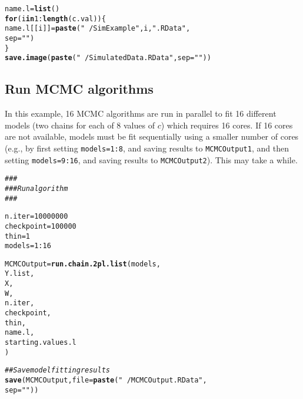 \documentclass[12pt,letterpaper,final]{article}\usepackage[]{graphicx}\usepackage[]{color}
\makeatletter
\newcommand{\hlnum}[1]{\textcolor[rgb]{0.686,0.059,0.569}{#1}}%
\newcommand{\hlstr}[1]{\textcolor[rgb]{0.192,0.494,0.8}{#1}}%
\newcommand{\hlcom}[1]{\textcolor[rgb]{0.678,0.584,0.686}{\textit{#1}}}%
\newcommand{\hlopt}[1]{\textcolor[rgb]{0,0,0}{#1}}%
\newcommand{\hlstd}[1]{\textcolor[rgb]{0.345,0.345,0.345}{#1}}%
\newcommand{\hlkwa}[1]{\textcolor[rgb]{0.161,0.373,0.58}{\textbf{#1}}}%
\newcommand{\hlkwb}[1]{\textcolor[rgb]{0.69,0.353,0.396}{#1}}%
\newcommand{\hlkwc}[1]{\textcolor[rgb]{0.333,0.667,0.333}{#1}}%
\newcommand{\hlkwd}[1]{\textcolor[rgb]{0.737,0.353,0.396}{\textbf{#1}}}%
\newenvironment{kframe}{%
 \def\at@end@of@kframe{}%
 \ifinner\ifhmode%
  \def\at@end@of@kframe{\end{minipage}}%
  \begin{minipage}{\columnwidth}%
 \fi\fi%
 \def\FrameCommand##1{\hskip\@totalleftmargin \hskip-\fboxsep
 \colorbox{shadecolor}{##1}\hskip-\fboxsep
     \hskip-\linewidth \hskip-\@totalleftmargin \hskip\columnwidth}%
 \MakeFramed {\advance\hsize-\width
   \@totalleftmargin\z@ \linewidth\hsize
   \@setminipage}}%
 {\par\unskip\endMakeFramed%
 \at@end@of@kframe}
\newenvironment{knitrout}{}{} %
\makeatother
\begin{document}
\begin{knitrout}
\begin{kframe}
\begin{alltt}
\hlstd{name.l}\hlkwb{=}\hlkwd{list}\hlstd{()}
\hlkwa{for}\hlstd{(i} \hlkwa{in} \hlnum{1}\hlopt{:}\hlkwd{length}\hlstd{(c.val))\{}
    \hlstd{name.l[[i]]}\hlkwb{=}\hlkwd{paste}\hlstd{(}\hlstr{"~/SimExample"}\hlstd{,i,}\hlstr{".RData"}\hlstd{,}
                      \hlkwc{sep}\hlstd{=}\hlstr{""}\hlstd{)}
\hlstd{\}}
\hlkwd{save.image}\hlstd{(}\hlkwd{paste}\hlstd{(}\hlstr{"~/SimulatedData.RData"}\hlstd{,}\hlkwc{sep}\hlstd{=}\hlstr{""}\hlstd{))}
\end{alltt}
\end{kframe}
\end{knitrout}

\subsection{Run MCMC algorithms}
In this example, 16 MCMC algorithms are run in parallel to fit 16
different models (two chains for each of 8 values of $c$) which
requires 16 cores. If 16 cores are not available, models must be fit
sequentially using a smaller number of cores (e.g., by first setting
\texttt{models=1:8}, and saving results to \texttt{MCMCOutput1}, and
then setting \texttt{models=9:16}, and saving results to \texttt{MCMCOutput2}).
This may take a while.

\begin{knitrout}
\color{fgcolor}\begin{kframe}
\begin{alltt}
\hlcom{###}
\hlcom{### Run algorithm}
\hlcom{###}

\hlstd{n.iter}\hlkwb{=}\hlnum{10000000}
\hlstd{checkpoint}\hlkwb{=}\hlnum{100000}
\hlstd{thin}\hlkwb{=}\hlnum{1}
\hlstd{models}\hlkwb{=}\hlnum{1}\hlopt{:}\hlnum{16}

\hlstd{MCMCOutput}\hlkwb{=}\hlkwd{run.chain.2pl.list}\hlstd{(models,}
                              \hlstd{Y.list,}
                              \hlstd{X,}
                              \hlstd{W,}
                              \hlstd{n.iter,}
                              \hlstd{checkpoint,}
                              \hlstd{thin,}
                              \hlstd{name.l,}
                              \hlstd{starting.values.l}
                              \hlstd{)}

\hlcom{## Save model fitting results}
\hlkwd{save}\hlstd{(MCMCOutput,}\hlkwc{file}\hlstd{=}\hlkwd{paste}\hlstd{(}\hlstr{"~/MCMCOutput.RData"}\hlstd{,}
                           \hlkwc{sep}\hlstd{=}\hlstr{""}\hlstd{))}
\end{alltt}
\end{kframe}
\end{knitrout}
\end{document}
